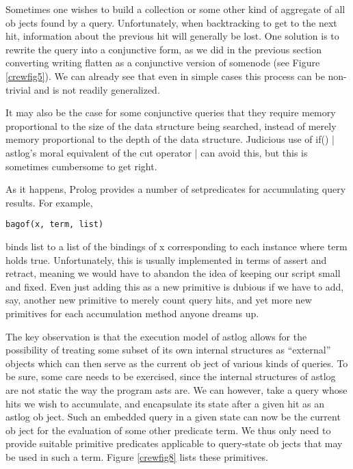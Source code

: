 
Sometimes one wishes to build a collection or some other kind of aggregate of
all ob jects found by a query. Unfortunately, when backtracking to get to the
next hit, information about the previous hit will generally be lost. One
solution is to rewrite the query into a conjunctive form, as we did in the
previous section converting writing flatten as a conjunctive version of somenode
(see Figure \ref{crewfig5}). We can already see that even in simple cases this
process can be non-trivial and is not readily generalized.

It may also be the case for some conjunctive queries
that they require memory proportional to the size of
the data structure being searched, instead of merely
memory proportional to the depth of the data structure.
Judicious use of if() | astlog's moral equivalent
of the cut operator | can avoid this, but this is
sometimes cumbersome to get right.

As it happens, Prolog provides a number of setpredicates for accumulating query
results. For example,
\begin{verbatim}
bagof(x, term, list)
\end{verbatim}
binds list to a list of the bindings of x corresponding to each instance where
term holds true. Unfortunately, this is usually implemented in terms of assert
and retract, meaning we would have to abandon the idea
of keeping our script small and fixed. Even just adding
this as a new primitive is dubious if we have to add,
say, another new primitive to merely count query hits,
and yet more new primitives for each accumulation
method anyone dreams up.

The key observation is that the execution model of
astlog allows for the possibility of treating some subset
of its own internal structures as ``external'' objects
which can then serve as the current ob ject of various
kinds of queries. To be sure, some care needs to be exercised,
since the internal structures of astlog are not
static the way the program asts are. We can however,
take a query whose hits we wish to accumulate, and
encapsulate its state after a given hit as an astlog
ob ject. Such an embedded query in a given state can
now be the current ob ject for the evaluation of some
other predicate term. We thus only need to provide
suitable primitive predicates applicable to query-state
ob jects that may be used in such a term. Figure \ref{crewfig8} lists
these primitives.

\label{crewfig9}

